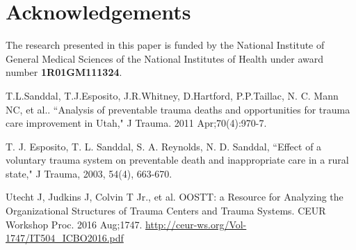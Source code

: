 \documentclass{amia}
\begin{document}
\section*{Acknowledgements}
The research presented in this paper is funded by the National Institute of General Medical Sciences of the National Institutes of Health under award number \textbf{1R01GM111324}.

\makeatletter
\renewcommand{\@biblabel}[1]{\hfill #1.}
\makeatother


\begin{thebibliography}{1}
\setlength\itemsep{-0.1em}

T.L.Sanddal, T.J.Esposito, J.R.Whitney, D.Hartford, P.P.Taillac, N. C. Mann NC, et al.. ``Analysis of preventable trauma deaths and opportunities for trauma care improvement in Utah," J Trauma. 2011 Apr;70(4):970-7.

T. J. Esposito, T. L. Sanddal, S. A. Reynolds, N. D. Sanddal, ``Effect of a voluntary trauma system on preventable death and inappropriate care in a rural state," J Trauma, 2003, 54(4), 663-670.

Utecht J, Judkins J, Colvin T Jr., et al. OOSTT: a Resource for Analyzing the Organizational Structures of Trauma Centers and Trauma Systems. CEUR Workshop Proc. 2016 Aug;1747. \href{http://ceur-ws.org/Vol-1747/IT504_ICBO2016.pdf}{http://ceur-ws.org/Vol-1747/IT504\_ICBO2016.pdf}

\end{thebibliography}
\end{document}
